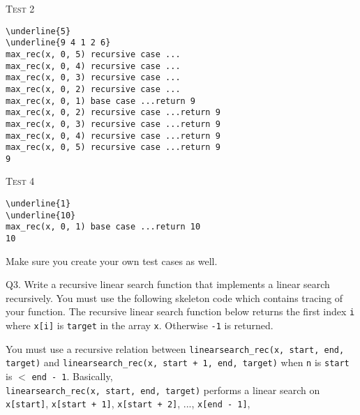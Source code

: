\textsc{Test 2}
\begin{Verbatim}[commandchars=\\\{\}, fontsize=\small, frame=single]
\underline{5}
\underline{9 4 1 2 6}
max_rec(x, 0, 5) recursive case ...
max_rec(x, 0, 4) recursive case ...
max_rec(x, 0, 3) recursive case ...
max_rec(x, 0, 2) recursive case ...
max_rec(x, 0, 1) base case ...return 9
max_rec(x, 0, 2) recursive case ...return 9
max_rec(x, 0, 3) recursive case ...return 9
max_rec(x, 0, 4) recursive case ...return 9
max_rec(x, 0, 5) recursive case ...return 9
9
\end{Verbatim}

\textsc{Test 4}
\begin{Verbatim}[commandchars=\\\{\}, fontsize=\small, frame=single]
\underline{1}
\underline{10}
max_rec(x, 0, 1) base case ...return 10
10
\end{Verbatim}


Make sure you create your own test cases as well.






\newpage
Q3.
Write a recursive linear search function that implements
a linear search recursively.
You must use the following skeleton code which
contains tracing of your function.
The recursive linear search function below returns
the first index \verb!i! where \verb!x[i]! is \verb!target!
in the array \verb!x!.
Otherwise \verb!-1! is returned.

You must use a recursive relation between
\verb!linearsearch_rec(x, start, end, target)!
and
\verb!linearsearch_rec(x, start + 1, end, target)!
when \verb!n! is \verb!start! is $<$ \verb!end - 1!.
Basically,
\\
\verb!linearsearch_rec(x, start, end, target)!
performs a linear search on
\\
\verb!x[start]!,
\verb!x[start + 1]!,
\verb!x[start + 2]!, ...,
\verb!x[end - 1]!,

